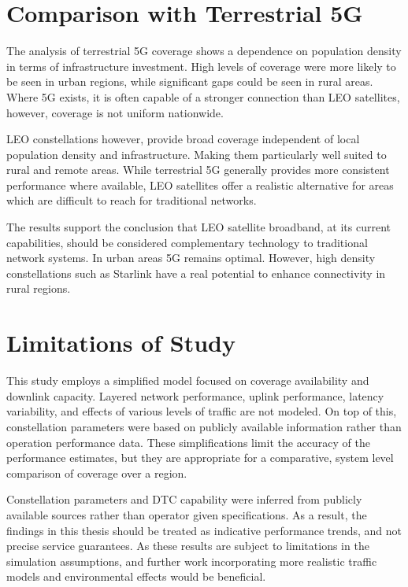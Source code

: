\section{Comparison with Terrestrial 5G}
The analysis of terrestrial 5G coverage shows a dependence on population density in terms of infrastructure investment. High levels of coverage were more likely to be seen in urban regions, while significant gaps could be seen in rural areas. Where 5G exists, it is often capable of a stronger connection than LEO satellites, however, coverage is not uniform nationwide. 

LEO constellations however, provide broad coverage independent of local population density and infrastructure. Making them particularly well suited to rural and remote areas. While terrestrial 5G generally provides more consistent performance where available, LEO satellites offer a realistic alternative for areas which are difficult to reach for traditional networks. 

The results support the conclusion that LEO satellite broadband, at its current capabilities, should be considered complementary technology to traditional network systems. In urban areas 5G remains optimal. However, high density constellations such as Starlink have a real potential to enhance connectivity in rural regions. 

\section{Limitations of Study}
This study employs a simplified model focused on coverage availability and downlink capacity. Layered network performance, uplink performance, latency variability, and effects of various levels of traffic are not modeled. On top of this, constellation parameters were based on publicly available information rather than operation performance data. These simplifications limit the accuracy of the performance estimates, but they are appropriate for a comparative, system level comparison of coverage over a region. 

Constellation parameters and DTC capability were inferred from publicly available sources rather than operator given specifications. As a result, the findings in this thesis should be treated as indicative performance trends, and not precise service guarantees.
As these results are subject to limitations in the simulation assumptions, and further work incorporating more realistic traffic models and environmental effects would be beneficial.
 

